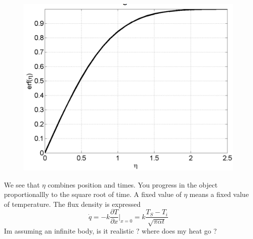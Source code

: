 		\begin{figure}
		\vspace{-5mm}
		\includegraphics[scale=0.2]{ch4/3}
		\end{figure}	
		We see that $\eta$ combines position and times. You progress in the object proportionallly to the square root of time. A fixed value of $\eta$ means a fixed value of temperature. The flux density is expressed 
		\begin{equation}
			\dot{q} = -k \frac{\partial T }{\partial x }| _{x=0} = k \frac{T_S-T_i}{\sqrt{\pi \alpha t}}
		\end{equation}
Im assuming an infinite body, is it realistic ? where does my heat go ?

